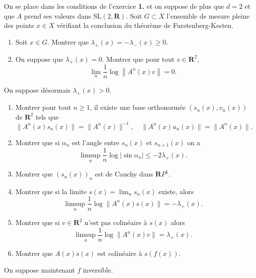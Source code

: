 \documentclass[a4paper,10pt,openany]{article}
\theoremstyle{plain}
\theoremstyle{definition}
\newcommand{\R}{\mathbf{R}}
\begin{document}
 \vspace{1.5mm}

\noindent On se place dans les conditions de l'exercice \textbf{1.} et on suppose de plus que $d=2$ et que $A$ prend ses valeurs dans $\mathrm{SL}(2,\R)$. Soit $G \subset X$ l'ensemble de mesure pleine des points $x \in X$ v\'erifiant la conclusion du th\'eor\`eme de Furstenberg-Kesten.

\begin{enumerate}

\item Soit $x \in G$. Montrer que $\lambda_+(x) = - \lambda_-(x) \geq 0$.

\item On suppose que $\lambda_+(x) = 0$. Montrer que pour tout $v \in \R^2$,
$$
\lim_n \frac{1}{n} \log \left\|A^n(x)v\right\| = 0.
$$
\end{enumerate}
\noindent On suppose d\'esormais $\lambda_+(x) > 0$.
\begin{enumerate}[resume]
\item Montrer pour tout $n \geq 1$, il existe une base orthonorm\'ee $(s_n(x), v_n(x))$ de $\R^2$ tels que
$$
\|A^n(x)s_n(x)\| = \|A^n(x)\|^{-1}, \quad \|A^n(x)u_n(x)\| = \|A^n(x)\|.
$$
\item Montrer que si $\alpha_n$ est l'angle entre $s_n(x)$ et $s_{n+1}(x)$ on a 
$$
\limsup_n \frac{1}{n}\log |\sin \alpha_n| \leq - 2 \lambda_+(x).
$$
\item Montrer que $(s_n(x))_n$ est de Cauchy dans $\R P^1$.
\item Montrer que si la limite $s(x) = \lim_n s_n(x)$ existe, alors
$$
\limsup_n \frac{1}{n} \log \|A^n(x)s(x)\| = -\lambda_+(x).
$$
\item Montrer que si $v \in \R^2$ n'est pas colin\'eaire \`a $s(x)$ alors
$$
\limsup_n \frac{1}{n} \log \|A^n(x)v\| = \lambda_+(x).
$$
\item Montrer que $A(x)s(x)$ est colin\'eaire \`a $s(f(x))$.
\end{enumerate}
\noindent On suppose maintenant $f$ inversible. 
\end{document}
